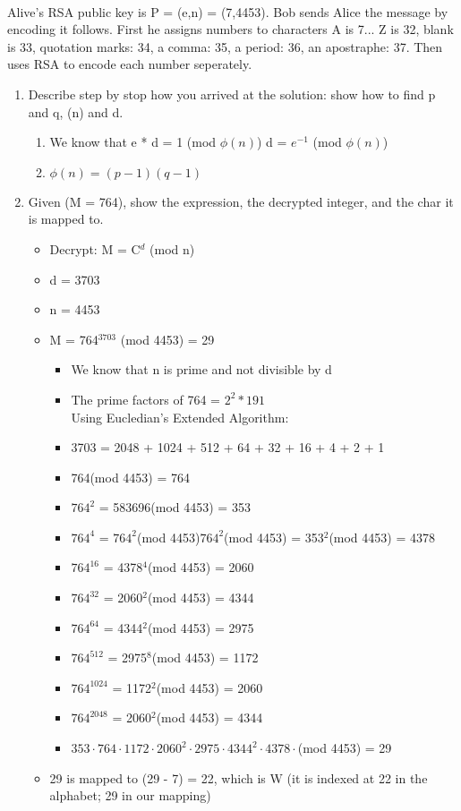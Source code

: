 \documentclass[11pt]{article}
\newcounter{prnum}
\newenvironment{problem}{{\vskip 0.2in\noindent\bf Problem
       \addtocounter{prnum}{1} \arabic{prnum}.}}{\vskip 0.1in}
\begin{document}
\begin{problem} \\
  Alive's RSA public key is P = (e,n) = (7,4453). 
  Bob sends Alice the message by encoding it follows.
  First he assigns numbers to characters A is 7... Z is 32, blank is 33,
  quotation marks: 34, a comma: 35, a period: 36,
  an apostraphe: 37. Then uses RSA to encode each number seperately.
  \begin{enumerate}
    \item Describe step by stop how you arrived at the solution:
      show how to find p and q, \phi(n) and d.
      \begin{enumerate}
        \item We know that e * d = 1 (mod $\phi(n)$) \Rightarrow\space d = $e^{-1}$ (mod $\phi(n)$)
        \item $\phi(n) = (p-1)(q-1)$
      \end{enumerate}
    \item Given (M = 764), show the expression, the decrypted integer, and the char it is mapped to.
      \begin{itemize}
        \item Decrypt: M = C$^d$ (mod n)
        \item d = 3703
        \item n = 4453
      \item M = 764$^{3703}$ (mod 4453) = 29
        \begin{itemize}
          \item We know that n is prime and not divisible by d
          \item The prime factors of 764 = $2^2 * 191$\\
          Using Eucledian's Extended Algorithm:
          \item 3703 = 2048 + 1024 + 512 + 64 + 32 + 16 + 4 + 2 + 1
          \item 764(mod 4453) = 764
          \item $764^{2}$ = 583696(mod 4453) = 353
          \item $764^{4}$ = $764^2$(mod 4453)\cdot$764^2$(mod 4453) = 353$^2$(mod 4453) = 4378
          \item $764^{16}$ = 4378$^4$(mod 4453) = 2060
          \item $764^{32}$ = 2060$^2$(mod 4453) = 4344
          \item $764^{64}$ = 4344$^2$(mod 4453) = 2975
          \item $764^{512}$ = 2975$^8$(mod 4453) = 1172
          \item $764^{1024}$ = 1172$^2$(mod 4453) = 2060
          \item $764^{2048}$ = 2060$^2$(mod 4453) = 4344
          \item $353\cdot764\cdot1172\cdot2060^2\cdot2975\cdot4344^2\cdot4378\cdot$(mod 4453) = 29
        \end{itemize}
      \item 29 is mapped to (29 - 7) = 22, which is W (it is indexed at 22 in the alphabet; 29 in our mapping)
      \end{itemize}


\end{enumerate}
\end{problem}
\end{document}
